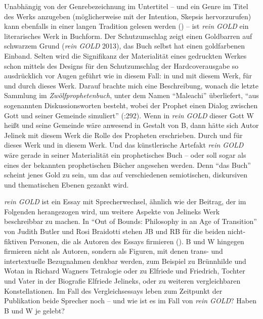 \documentclass[fontsize=12pt]{scrartcl}
\begin{document}
Unabh\"angig von der Genrebe\-zeichnung im Untertitel -- und ein Genre im Titel des Werks anzugeben (m\"oglicherweise mit der Intention, Skepsis hervorzurufen) kann ebenfalls in einer langen Tradition gelesen werden (\cite{Perigot2014}) -- ist \textit{rein GOLD} ein li\-te\-ra\-risches Werk in Buchform. Der Schutzumschlag zeigt einen Goldbarren auf schwarzem Grund (\textit{rein GOLD} 2013), das Buch \mbox{selbst} hat einen goldfarbenen Einband. Selten wird die Signifikanz der Materialit\"at eines gedruckten Werkes schon mittels des Designs f\"ur den Schutzumschlag der Hardcoverausgabe so ausdr\"ucklich vor Augen gef\"uhrt wie in diesem Fall: in und mit diesem Werk, f\"ur und durch dieses Werk. Darauf brachte mich eine Beschreibung, wonach die letzte Sammlung im \textit{Zw\"olfprophetenbuch}, unter dem Namen "`Maleachi"' \"uberliefert, "`aus so\-ge\-nann\-ten Dis\-kus\-si\-onsworten be\-steht, wobei der Prophet einen Dialog zwischen Gott und seiner Gemeinde simuliert"' (\cite{SeyboldUngern-Sternberg2011}:292). Wenn in \textit{rein GOLD} dieser Gott W hei{\ss}t und seine Gemeinde w\"are anwesend in Gestalt von B, dann h\"atte sich Autor\textsuperscript{\tiny *} Jelinek mit diesem Werk die Rolle des Propheten\textsuperscript{\tiny *} erschrieben. Durch und f\"ur dieses Werk und in diesem Werk. Und das k\"unstlerische Artefakt \textit{rein GOLD} w\"are gerade in seiner Materialit\"at ein prophetisches Buch -- oder soll sogar als eines der bekannten prophetischen B\"ucher angesehen werden. Denn "`das Buch"' scheint jenes Gold zu sein, um das auf verschiedenen se\-mio\-tischen, diskursiven und thematischen Ebenen gezankt wird. 

\textit{rein GOLD} ist ein Essay mit Sprecher\textsuperscript{\tiny *}wechsel, \"ahnlich wie der Beitrag, der im Folgenden herangezogen wird, um weitere Aspekte von Jelineks Werk beschreibbar zu machen. In "`Out of Bounds: Philosophy in an Age of Transition"' von Judith Butler und Rosi Braidotti stehen JB und RB f\"ur die beiden nicht-fiktiven Per\-so\-nen, die als Autoren\textsuperscript{\tiny *} des Essays firmieren (\cite{ButlerBraidotti2010}). B und W hingegen firmieren nicht als Autoren\textsuperscript{\tiny *}, sondern als Figuren, mit denen trans- und intertextuelle Bezugnahmen denkbar werden, zum Beispiel zu Br\"unnhilde und Wotan in Richard Wagners Tetralogie oder zu Elfriede und Friedrich, Tochter und Vater in der Bio\-gra\-fie Elfriede Jelineks, oder zu weiteren vergleichbaren Konstellationen. Im Fall des Vergleichs\-essays leben zum Zeitpunkt der Publikation beide Sprecher\textsuperscript{\tiny *} noch -- und wie ist es im Fall von \textit{rein GOLD}? Haben B und W je gelebt?
\end{document}
